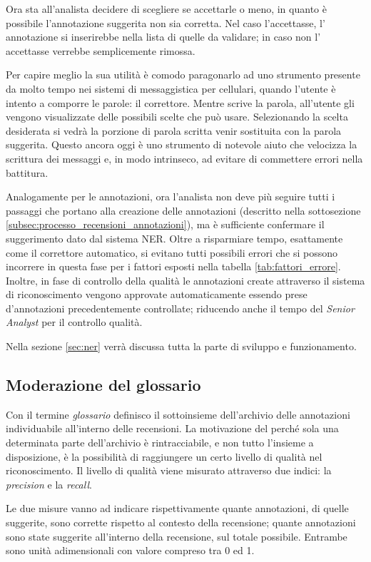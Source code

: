 Ora sta all'analista decidere di scegliere se accettarle o meno, in quanto è
possibile l'annotazione suggerita non sia corretta. Nel caso l'accettasse, l'
annotazione si inserirebbe nella lista di quelle da validare; in caso non l'
accettasse verrebbe semplicemente rimossa.

Per capire meglio la sua utilità è comodo paragonarlo ad uno strumento presente
da molto tempo nei sistemi di messaggistica per cellulari, quando l'utente è
intento a comporre le parole: il correttore. Mentre scrive la parola,
all'utente gli vengono visualizzate delle possibili scelte che può usare.
Selezionando la scelta desiderata si vedrà la porzione di parola scritta venir
sostituita con la parola suggerita. Questo ancora oggi è uno strumento di
notevole aiuto che velocizza la scrittura dei messaggi e, in modo intrinseco, ad
evitare di commettere errori nella battitura.

Analogamente per le annotazioni, ora l'analista non deve più seguire tutti i
passaggi che portano alla creazione delle annotazioni (descritto nella
sottosezione \ref{subsec:processo_recensioni_annotazioni}), ma è sufficiente
confermare il suggerimento dato dal sistema \gls{NER}. Oltre a risparmiare
tempo, esattamente come il correttore automatico, si evitano tutti possibili
errori che si possono incorrere in questa fase per i fattori esposti nella
tabella \ref{tab:fattori_errore}. Inoltre, in fase di controllo della qualità le
annotazioni create attraverso il sistema di riconoscimento vengono approvate
automaticamente essendo prese d'annotazioni precedentemente controllate;
riducendo anche il tempo del \textit{Senior Analyst} per il controllo qualità.

Nella sezione \ref{sec:ner} verrà discussa tutta la parte di sviluppo e
funzionamento.

\subsection{Moderazione del glossario}
Con il termine \textit{glossario} definisco il sottoinsieme dell'archivio
delle annotazioni individuabile all'interno delle recensioni. La motivazione del
perché sola una determinata parte dell'archivio è rintracciabile, e non tutto
l'insieme a disposizione, è la possibilità di raggiungere un certo livello di
qualità nel riconoscimento. Il livello di qualità viene misurato attraverso due
indici: la \textit{precision} e la \textit{recall}.

Le due misure vanno ad indicare rispettivamente quante annotazioni, di quelle
suggerite, sono corrette rispetto al contesto della recensione; quante
annotazioni sono state suggerite all'interno della recensione, sul totale
possibile. Entrambe sono unità adimensionali con valore compreso tra 0 ed 1.

